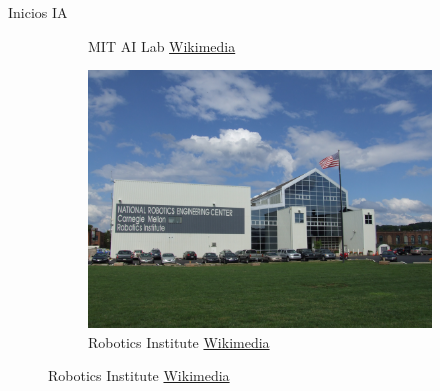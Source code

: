 \begin{frame}[fragile]{Inicios IA}
\begin{figure}
\begin{subfigure}{0.32\textwidth}
			\caption{MIT AI Lab \href{https://commons.wikimedia.org/wiki/File:Stata_Center1.jpg}{Wikimedia}}
		\end{subfigure}
		\pause
		\begin{subfigure}{0.33\textwidth}
			\centering
			\includegraphics[scale=0.026]{./EtapaModerna/Imagenes/robotics_institute.jpg}
			\caption{Robotics Institute \href{https://commons.wikimedia.org/wiki/File:National_Robotics_Engineering_Center.JPG}{Wikimedia}}
		\end{subfigure}
	\end{figure}
\end{frame}


